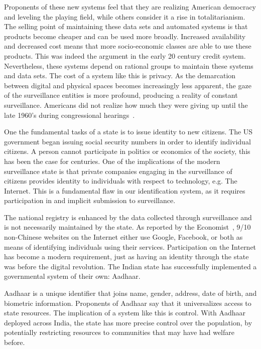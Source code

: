 Proponents of these new systems feel that they are realizing American democracy
and leveling the playing field, while others consider it a rise in
totalitarianism. The selling point of maintaining these data sets and
automated systems is that products become cheaper and can be used more broadly.
Increased availability and decreased cost means that more socio-economic
classes are able to use these products. This was indeed the argument in the
early 20 century credit system. Nevertheless, these systems depend on
rational groups to maintain these systems and data sets. The cost of a system
like this is privacy. As the demarcation between digital and physical spaces
becomes increasingly less apparent, the gaze of the surveillance entities is
more profound, producing a reality of constant surveillance. Americans did not
realize how much they were giving up until the late 1960's during congressional
hearings~\cite{lauer2017creditworthy}.

One the fundamental tasks of a state is to issue identity to new citizens.
The US government began issuing social security numbers in order to identify
individual citizens.
A person cannot participate in politics or economics of the society, this has been the case for centuries.
One of the implications of the modern
surveillance state is that private companies engaging in the surveillance of
citizens provides identity to individuals with respect to technology, e.g. The
Internet. This is a fundamental flaw in our identification system, as it
requires participation in and implicit submission to surveillance.

The national registry is enhanced by the data collected through surveillance
and is not necessarily maintained by the state. As reported by the
Economist~\cite{identity2018economist}, 9/10
non-Chinese websites on the Internet either use Google, Facebook, or both as means of
identifying individuals using their services. Participation on the Internet has
become a modern requirement, just as having an identity through the state was
before the digital revolution. The Indian state has successfully implemented
a governmental system of their own: Aadhaar.

Aadhaar is a unique identifier that joins name, gender, address, date of birth,
and biometric information. Proponents of Aadhaar say that it universalizes
access to state resources. The implication of a system like this is control.
With Aadhaar deployed across India, the state has more precise control over the
population, by potentially restricting resources to communities that may have
had welfare before.

